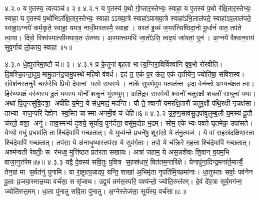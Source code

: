४.२.०
य ए॒तस्य॒ त्वत्पञ्च॑॥ २॥
४.२.१
य ए॒तस्य॑ प॒थो गो॒प्तार॒स्तेभ्यः॒ स्वाहा॒ य ए॒तस्य॑ प॒थो र॑क्षि॒तार॒स्तेभ्यः॒ स्वाहा॒ य ए॒तस्य॑ प॒थो॑भिऽर॑क्षि॒तार॒स्तेभ्यः॒ स्वाहाऽऽख्या॒त्रे स्वाहा॑ऽपाख्या॒त्रे स्वाहा॑ऽभि॒लाल॑पते॒ स्वाहा॑ऽप॒लाल॑पते॒ स्वाहा॒ऽग्नये॑ कर्म॒कृते॒ स्वाहा॒ यमत्र॒ नाधी॒मस्तस्मै॒ स्वाहा। यस्त॑ इ॒ध्मं ज॒भर॑त्सिष्विदा॒नो मू॒र्धानं॑ वात॒ तप॑ते त्वा॒या। दिवो॒ विश्व॑स्मात्सीमघाय॒त उ॑रुष्यः। अ॒स्मात्त्वमधि॑ जा॒तो॑ऽसि॒ त्वद॒यं जा॑यतां॒ पुन॑। अ॒ग्नये॑ वैश्वान॒राय॑ सुव॒र्गाय॑ लो॒काय॒ स्वाहा॥५॥
\anuvakamend

४.३.०
धे॒ह्युत्त॑रेमा॒ष्टौ च॑॥ ३।
४.३.१
प्र के॒तुना॑ बृह॒ता भात्य॒ग्निरा॒विर्विश्वा॑नि वृष॒भो रो॑रवीति। दि॒वश्चि॒दन्ता॒दुप॒ मामु॒दान॑ड॒पामु॒पस्थे॑ महि॒षो व॑वर्ध। इ॒दं त॒ एकं॑ प॒र ऊ॑त॒ एकं॑ तृ॒तीये॑न॒ ज्योति॑षा॒ संवि॑शस्व। सं॒वेश॑नस्त॒नुवै॒ चारु॑रेधि प्रि॒यो दे॒वानां पर॒मे स॒धस्थे। नाके॑ सुप॒र्णमुप॒ यत्पत॑न्त हृ॒दा वेन॑न्तो अ॒भ्यच॑क्षत त्वा। हिर॑ण्यपक्षं॒ वरु॑णस्य दू॒तं य॒मस्य॒ योनौ॑ शकु॒नं भु॑र॒ण्युम्। अति॑द्रव सारमे॒यौ श्वानौ॑ चतुर॒क्षौ श॒बलौ॑ सा॒धुना॑ प॒था। अथा॑ पि॒तॄन्त्सु॑वि॒दत्रा॒ अपी॑हि य॒मेन॒ ये स॑ध॒मादं॒ मद॑न्ति। यौ ते॒ श्वानौ॑ यमरक्षि॒तारौ॑ चतुर॒क्षौ प॑थि॒रक्षी॑ नृ॒चक्ष॑सा। ताभ्या राज॒न्परि॑ देह्येन स्व॒स्ति चास्मा अनमी॒वं च॑ धेहि॥६॥
४.३.२
उ॒रु॒ण॒साव॑सु॒तृपा॑वुलुम्ब॒लौ य॒मस्य॑ दू॒तौ च॑रतो॒ वशा॒ अनु॑। ताव॒स्मभ्यं॑ दृ॒शये॒ सूर्या॑य॒ पुन॑र्दत्ता॒ वसु॑म॒द्येह भ॒द्रम्। सोम॒ एकेभ्यः पवते घृ॒तमेक॒ उपा॑सते। येभ्यो॒ मधु॑ प्र॒धाव॑ति॒ ताश्चि॑दे॒वापि॑ गच्छतात्। ये युध्य॑न्ते प्र॒धने॑षु॒ शूरा॑सो॒ ये त॑नु॒त्यज॑। ये वा॑ स॒हस्र॑दक्षिणा॒स्ता श्चि॑दे॒वापि॑ गच्छतात्। तप॑सा॒ ये अ॑नाधृ॒ष्यास्तप॑सा॒ ये सुव॑र्ग॒ताः। तपो॒ ये च॑क्रि॒रे म॒हत्ताश्चि॑दे॒वापि॑ गच्छतात्। अश्म॑न्वती रेवतीः॒ स र॑भध्व॒ मुत्ति॑ष्ठत प्रत॑रता सखायः। अत्रा॑ जहाम॒ ये अस॒न्नशे॑वाः  शि॒वान् व॒यम॒भि वाजा॒नुत्त॑रेम॥७॥
४.३.३
यद्वै दे॒वस्य॑ सवि॒तुः प॒वित्र स॒हस्र॑धारं॒  वित॑तम॒न्तरि॑क्षे। येनापु॑ना॒दिन्द्र॒मना॑र्त॒मार्त्यै॒ तेना॒हं मा स॒र्वत॑नुं पुनामि। या रा॒ष्ट्रात्प॒न्नादप॒ यन्ति॒ शाखा॑ अ॒भिमृ॑ता नृ॒पति॑मि॒च्छमा॑नाः। धा॒तुस्ताः सर्वाः॒ पव॑नेन पू॒ताः प्र॒जया॒स्मान्र॒य्या वर्च॑सा॒ ससृ॑जाथ। उद्व॒यं तम॑स॒स्परि॒ पश्य॑न्तो॒ ज्योति॒रुत्त॑रम्। दे॒वं दे॑व॒त्रा सूर्य॒मग॑न्म॒ ज्योति॑रुत्त॒मम्। धा॒ता पु॑नातु सवि॒ता पु॑नातु। अ॒ग्नेस्तेज॑सा॒ सूर्य॑स्य॒ वर्च॑सा॥८॥
\anuvakamend

